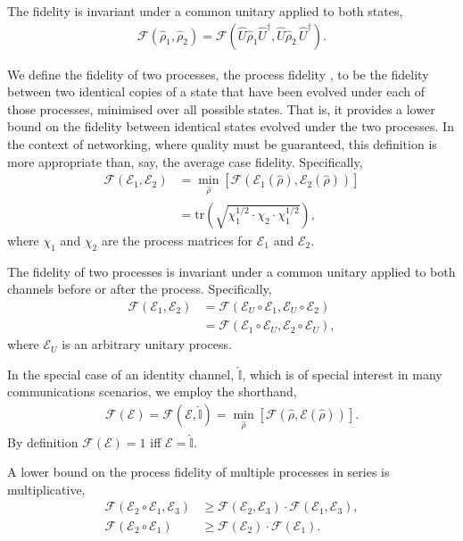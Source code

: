 \documentclass[aps, rmp, twocolumn, amsmath, amssymb, nofootinbib, superscriptaddress, longbibliography, floatfix, table-of-contents, eqsecnum]{revtex4-1}
\newcommand{\comment}[1]{{\color{blue}{\textbf{#1}}}}
\begin{document}
The fidelity is invariant under a common unitary applied to both states,
\begin{align}
\mathcal{F}(\hat\rho_1,\hat\rho_2) = \mathcal{F}(\hat{U}\hat\rho_1 \hat{U}^\dag,\hat{U} \hat\rho_2\,\hat{U}^\dag).
\end{align}

We define the fidelity of two processes, the process fidelity  \cite{bib:Gilchrist05}, to be the fidelity between two identical copies of a state that have been evolved under each of those processes, minimised over all possible states. That is, it provides a lower bound on the fidelity between identical states evolved under the two processes. In the context of networking, where quality must be guaranteed, this definition is more appropriate than, say, the average case fidelity. Specifically,
\begin{align}
\mathcal{F}(\mathcal{E}_1,\mathcal{E}_2) &= \min_{\hat\rho} \left[\mathcal{F}(\mathcal{E}_1(\hat\rho),\mathcal{E}_2(\hat\rho))\right] \nonumber \\
&= \text{tr}\left(\sqrt{\chi_1^{1/2}\cdot\chi_2\cdot\chi_1^{1/2}}\right),
\end{align}
\comment{CHECK THIS!} where $\chi_1$ and $\chi_2$ are the process matrices for $\mathcal{E}_1$ and $\mathcal{E}_2$.

The fidelity of two processes is invariant under a common unitary applied to both channels before or after the process. Specifically,
\begin{align}
\mathcal{F}(\mathcal{E}_1,\mathcal{E}_2) &= \mathcal{F}(\mathcal{E}_U\circ\mathcal{E}_1,\mathcal{E}_U\circ\mathcal{E}_2) \nonumber \\
&= \mathcal{F}(\mathcal{E}_1\circ \mathcal{E}_U,\mathcal{E}_2\circ \mathcal{E}_U),
\end{align}
where $\mathcal{E}_U$ is an arbitrary unitary process.

In the special case of an identity channel, $\hat{\mathbb{I}}$, which is of special interest in many communications scenarios, we employ the shorthand,
\begin{align}
\mathcal{F}(\mathcal{E}) = \mathcal{F}(\mathcal{E},\hat{\mathbb{I}}) = \min_{\hat\rho} \left[\mathcal{F}(\hat\rho,\mathcal{E}(\hat\rho))\right].
\end{align}
By definition \mbox{$\mathcal{F}(\mathcal{E})=1$} iff \mbox{$\mathcal{E}=\hat{\mathbb{I}}$}.

A lower bound on the process fidelity of multiple processes in series is multiplicative,
\begin{align}
\mathcal{F}(\mathcal{E}_2\circ\mathcal{E}_1,\mathcal{E}_3) &\geq \mathcal{F}(\mathcal{E}_2,\mathcal{E}_3)\cdot\mathcal{F}(\mathcal{E}_1,\mathcal{E}_3), \nonumber \\
\mathcal{F}(\mathcal{E}_2\circ\mathcal{E}_1) &\geq \mathcal{F}(\mathcal{E}_2)\cdot\mathcal{F}(\mathcal{E}_1).
\end{align}
\end{document}
